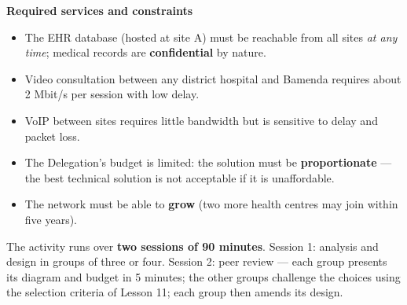 \documentclass[11pt]{article}
\newcounter{popsec}
\newcounter{popsub}
\newcommand{\courssub}[1]{%
  \stepcounter{popsub}%
  \par\vspace{9pt}\noindent{\popxbold\fontsize{11.5}{13}\selectfont\color{popink}{\color{poporange}\thepopsec.\thepopsub}\hspace{6pt}#1}\par\nopagebreak\vspace{4pt}
}
\begin{document}
\begin{experience}
\textbf{Required services and constraints}

\begin{itemize}
\item The EHR database (hosted at site A) must be reachable from all sites \emph{at any time}; medical records are \textbf{confidential} by nature.
\item Video consultation between any district hospital and Bamenda requires about 2 Mbit/s per session with low delay.
\item VoIP between sites requires little bandwidth but is sensitive to delay and packet loss.
\item The Delegation's budget is limited: the solution must be \textbf{proportionate} — the best technical solution is not acceptable if it is unaffordable.
\item The network must be able to \textbf{grow} (two more health centres may join within five years).
\end{itemize}
\end{experience}

The activity runs over \textbf{two sessions of 90 minutes}. Session 1: analysis and design in groups of three or four. Session 2: peer review — each group presents its diagram and budget in 5 minutes; the other groups challenge the choices using the selection criteria of Lesson 11; each group then amends its design.

\courssub{Tasks}
\end{document}
